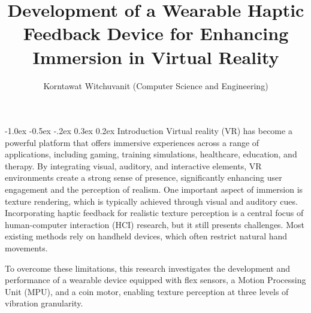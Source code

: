 \documentclass[a4paper,twocolumn]{article}
\title{\textbf{\Large Development of a Wearable Haptic Feedback Device for Enhancing Immersion in Virtual Reality}}
\author{\small{Korntawat Witchuvanit (Computer Science and Engineering)}}
\date{\vspace{-3em}}
\begin{document}
\small
\maketitle

\makeatletter
\renewcommand\section{\@startsection{section}{1}{\z@}%
  {-1.0ex \@plus -0.5ex \@minus -.2ex}%
  {0.3ex \@plus 0.2ex}%
  {\normalfont\normalsize\bfseries}}
\makeatother



\section{Introduction}
Virtual reality (VR) has become a powerful platform that offers immersive experiences across a range of applications, including gaming, training simulations, healthcare, education, and therapy\cite{10.3389/frobt.2016.00074}. By integrating visual, auditory, and interactive elements, VR environments create a strong sense of presence, significantly enhancing user engagement and the perception of realism. 
One important aspect of immersion is texture rendering, which is typically achieved through visual and auditory cues. Incorporating haptic feedback for realistic texture perception is a central focus of human-computer interaction (HCI) research, but it still presents challenges. Most existing methods rely on handheld devices, which often restrict natural hand movements.

To overcome these limitations, this research investigates the development and performance of a wearable device equipped with flex sensors, a Motion Processing Unit (MPU), and a coin motor, enabling texture perception at three levels of vibration granularity.
\end{document}
